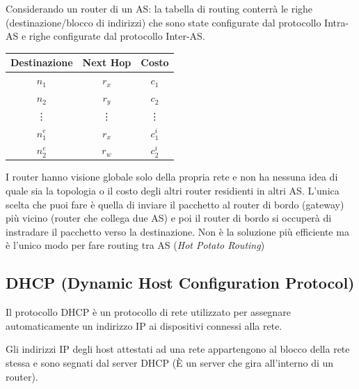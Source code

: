 \documentclass[a4paper]{article}
\begin{document}
\vspace{1em}
\noindent
Considerando un router di un AS: la tabella di routing conterrà le righe (destinazione/blocco di indirizzi) che sono state configurate dal protocollo Intra-AS e
righe configurate dal protocollo Inter-AS.

\begin{table}[H]
  \centering
  \begin{tabular}{c|c|c}
    Destinazione & Next Hop & Costo\\
    \hline
    $n_1$ & $r_x$ & $c_1$\\
    $n_2$ & $r_y$ & $c_2$\\
    \vdots & \vdots & \vdots\\
    $n^e_1$ & $r_x$ & $c^i_1$\\
    $n^e_2$ & $r_w$ & $c^i_2$\\
  \end{tabular}
\end{table}
\noindent
I router hanno visione globale solo della propria rete e non ha nessuna idea di quale sia la topologia o il costo degli altri router residienti in altri AS.
L'unica scelta che puoi fare è quella di inviare il pacchetto al router di bordo (gateway) più vicino (router che collega due AS) e poi il router di bordo si occuperà di instradare il pacchetto verso la destinazione.
Non è la soluzione più efficiente ma è l'unico modo per fare routing tra AS (\textit{Hot Potato Routing})

\subsection{DHCP (Dynamic Host Configuration Protocol)}
\begin{definition}
  Il protocollo DHCP è un protocollo di rete utilizzato per assegnare automaticamente un indirizzo IP ai dispositivi connessi alla rete.
\end{definition}
\noindent
Gli indirizzi IP degli host attestati ad una rete appartengono al blocco della rete stessa e sono segnati dal server DHCP (È un server che gira all'interno di un router). 
\end{document}
